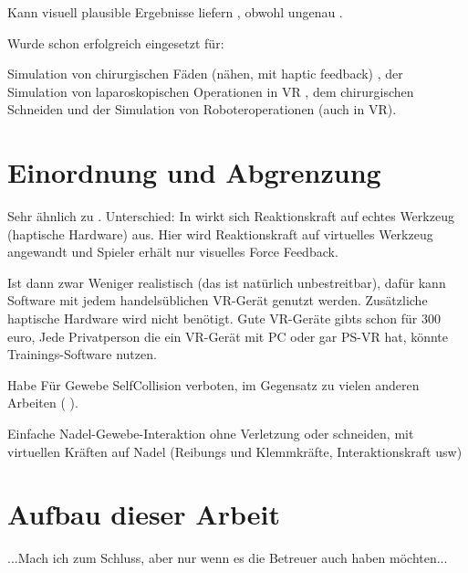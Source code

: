 Kann visuell plausible Ergebnisse liefern \cite{PBDKidney} \cite{BreastBiopsy}, obwohl ungenau .

Wurde schon erfolgreich eingesetzt für:

Simulation von chirurgischen Fäden (nähen, mit haptic feedback) \cite{PBDThread}, 
der Simulation von laparoskopischen Operationen in VR \cite{VRLaparoscop}, 
dem chirurgischen Schneiden \cite{PBDCutting}
und der Simulation von Roboteroperationen \cite{VRRobSim} (auch in VR).

\section{Einordnung und Abgrenzung}

Sehr ähnlich zu \cite{VRSim20}. Unterschied: In \cite{VRSim20} wirkt sich Reaktionskraft auf echtes Werkzeug (haptische Hardware) aus. Hier wird Reaktionskraft auf virtuelles Werkzeug angewandt und Spieler erhält nur visuelles Force Feedback. 

Ist dann zwar Weniger realistisch (das ist natürlich unbestreitbar), dafür kann Software mit jedem handelsüblichen VR-Gerät genutzt werden. Zusätzliche haptische Hardware wird nicht benötigt. Gute VR-Geräte gibts schon für 300 euro, Jede Privatperson die ein VR-Gerät mit PC oder gar PS-VR hat, könnte Trainings-Software nutzen.

Habe Für Gewebe SelfCollision verboten, im Gegensatz zu vielen anderen Arbeiten (\cite{BreastBiopsy} \cite{PBDKidney}).

Einfache Nadel-Gewebe-Interaktion ohne Verletzung oder schneiden, mit virtuellen Kräften auf Nadel (Reibungs und Klemmkräfte, Interaktionskraft usw)



\section{Aufbau dieser Arbeit}

...Mach ich zum Schluss, aber nur wenn es die Betreuer auch haben möchten...





